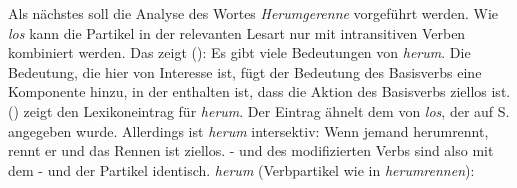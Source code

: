 Als nächstes soll die Analyse des Wortes \emph{Herumgerenne} vorgeführt werden.
Wie \emph{los} kann die Partikel  in der relevanten Lesart nur mit intransitiven Verben kombiniert werden.
Das zeigt ():
\eal
{}
\zl
Es gibt viele Bedeutungen von \emph{herum}. Die Bedeutung,
die hier von Interesse ist, fügt der Bedeutung des Basisverbs
eine Komponente hinzu, in der enthalten ist, dass die Aktion
des Basisverbs ziellos ist.
() zeigt den Lexikoneintrag für \emph{herum}.
Der Eintrag ähnelt dem von \emph{los}, der auf S.\,\pageref{le-los-asp}
angegeben wurde. Allerdings ist \emph{herum} intersektiv: Wenn jemand herumrennt, rennt er und das
Rennen ist ziellos. \ltop- und \indw des modifizierten Verbs sind also mit dem \ltop- und \indw der
Partikel identisch.
%
\eas
\label{le-herum-part}%
\emph{herum} (Verbpartikel wie in \emph{herumrennen}):\\
\zs

